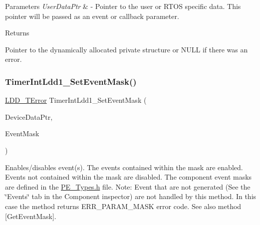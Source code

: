 \begin{DoxyParams}{Parameters}
{\em User\+Data\+Ptr} & -\/ Pointer to the user or R\+T\+OS specific data. This pointer will be passed as an event or callback parameter. \\
\hline
\end{DoxyParams}
\begin{DoxyReturn}{Returns}

\begin{DoxyItemize}
\item Pointer to the dynamically allocated private structure or N\+U\+LL if there was an error. 
\end{DoxyItemize}
\end{DoxyReturn}
\mbox{\label{group___timer_int_ldd1__module_gaf99e15010d993ffdbc1d2eb08d4d229d}} 
\subsubsection{\texorpdfstring{Timer\+Int\+Ldd1\+\_\+\+Set\+Event\+Mask()}{TimerIntLdd1\_SetEventMask()}}
{\footnotesize\ttfamily \hyperlink{group___p_e___types__module_ga24c2b045fd04e79e85f261ce4df35588}{L\+D\+D\+\_\+\+T\+Error} Timer\+Int\+Ldd1\+\_\+\+Set\+Event\+Mask (\begin{DoxyParamCaption}\item[{\hyperlink{group___p_e___types__module_gac5cf1362f1f0e3a2ce71b1bf2276d091}{L\+D\+D\+\_\+\+T\+Device\+Data} $\ast$}]{Device\+Data\+Ptr,  }\item[{\hyperlink{group___p_e___types__module_gafbe7f4d4e51560399c3bdd0218584533}{L\+D\+D\+\_\+\+T\+Event\+Mask}}]{Event\+Mask }\end{DoxyParamCaption})}



Enables/disables event(s). The events contained within the mask are enabled. Events not contained within the mask are disabled. The component event masks are defined in the \hyperlink{_p_e___types_8h}{P\+E\+\_\+\+Types.\+h} file. Note\+: Event that are not generated (See the \char`\"{}\+Events\char`\"{} tab in the Component inspector) are not handled by this method. In this case the method returns E\+R\+R\+\_\+\+P\+A\+R\+A\+M\+\_\+\+M\+A\+SK error code. See also method \mbox{[}Get\+Event\+Mask\mbox{]}. 


